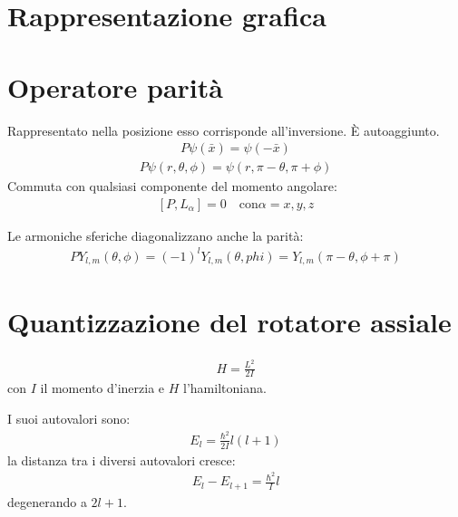 \section{Rappresentazione grafica} %


\section{Operatore parità} %
Rappresentato nella posizione esso corrisponde all'inversione. È autoaggiunto.
\begin{equation}\begin{split}
P\psi \left(\bar x\right)=\psi \left(-\bar x\right)
\end{split}\end{equation}
\begin{equation}\begin{split}
P\psi \left(r,\theta,\phi\right)=\psi \left(r,\pi - \theta,\pi + \phi\right)
\end{split}\end{equation}
Commuta con qualsiasi componente del momento angolare:
\begin{equation}\begin{split}
\left[P,L_\alpha\right]=0 \quad \textrm{con} \alpha =x,y,z
\end{split}\end{equation}

Le armoniche sferiche diagonalizzano anche la parità:
\begin{equation}\begin{split}
PY_{l,m}\left(\theta,\phi\right)=\left(-1\right)^lY_{l,m}\left(\theta,phi\right)=Y_{l,m}\left(\pi -\theta,\phi +\pi\right)
\end{split}\end{equation}

\section{Quantizzazione del rotatore assiale} %
\begin{equation}\begin{split}
H=\frac{L^2}{2I}
\end{split}\end{equation}
con $I$ il momento d'inerzia e $H$ l'hamiltoniana.

I suoi autovalori sono:
\begin{equation}\begin{split}
E_l=\frac{\hbar ^2}{2I}l\left(l+1\right)
\end{split}\end{equation}
la distanza tra i diversi autovalori cresce:
\begin{equation}\begin{split}
E_l-E_{l+1}=\frac{\hbar ^2}{I}l
\end{split}\end{equation}
degenerando a $2l+1$.


